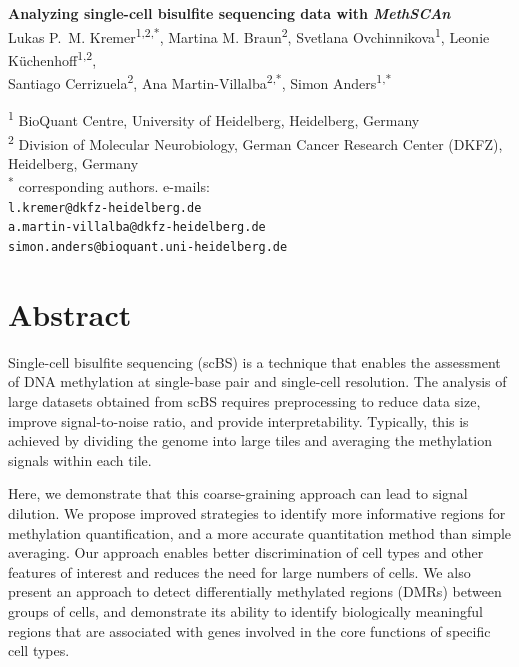 \documentclass[10pt]{article}
\begin{document}
{\centering{}
\textbf{\Large Analyzing single-cell bisulfite sequencing data with \textit{MethSCAn}}\\[1.5ex]

Lukas P.~M. Kremer\textsuperscript{1,2,*},
Martina M. Braun\textsuperscript{2},
Svetlana Ovchinnikova\textsuperscript{1},
Leonie Küchenhoff\textsuperscript{1,2},\\
Santiago Cerrizuela\textsuperscript{2},
Ana Martin-Villalba\textsuperscript{2,*},
Simon Anders\textsuperscript{1,*}\\[2em]
}
\noindent\textsuperscript{1} BioQuant Centre, University of Heidelberg, Heidelberg, Germany\\
\textsuperscript{2} Division of Molecular Neurobiology, German Cancer Research Center (DKFZ), Heidelberg, Germany\\
\textsuperscript{*} corresponding authors. e-mails:\\
\texttt{l.kremer@dkfz-heidelberg.de}\\
\texttt{a.martin-villalba@dkfz-heidelberg.de}\\
\texttt{simon.anders@bioquant.uni-heidelberg.de}


\section*{Abstract}

\noindent Single-cell bisulfite sequencing (scBS) is a technique that enables the assessment of DNA methylation at single-base pair and single-cell resolution.
The analysis of large datasets obtained from scBS requires preprocessing to reduce data size, improve signal-to-noise ratio, and provide interpretability.
Typically, this is achieved by dividing the genome into large tiles and averaging the methylation signals within each tile.

Here, we demonstrate that this coarse-graining approach can lead to signal dilution.
We propose improved strategies to identify more informative regions for methylation quantification, and a more accurate quantitation method than simple averaging.
Our approach enables better discrimination of cell types and other features of interest and reduces the need for large numbers of cells.
We also present an approach to detect differentially methylated regions (DMRs) between groups of cells, and demonstrate its ability to identify biologically meaningful regions that are associated with genes involved in the core functions of specific cell types.
\end{document}
